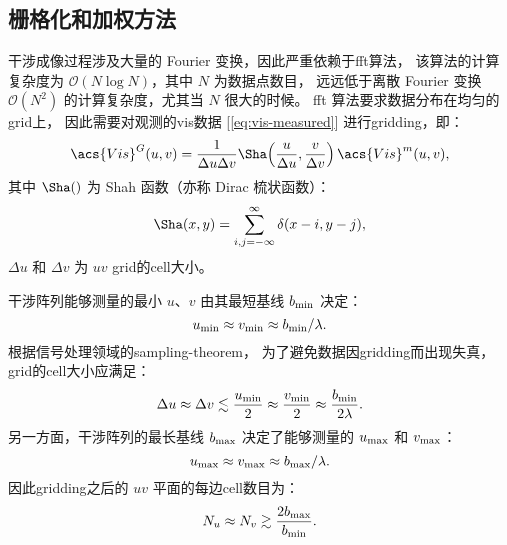\subsection{栅格化和加权方法}

干涉成像过程涉及大量的 Fourier 变换，因此严重依赖于\ac{fft}算法，
该算法的计算复杂度为 $\mathcal{O}(N \log N)$，其中 $N$ 为数据点数目，
远远低于离散 Fourier 变换 $\mathcal{O}(N^2)$ 的计算复杂度，尤其当 $N$ 很大的时候。
\ac{fft} 算法要求数据分布在均匀的\ac{grid}上，
因此需要对观测的\ac{vis}数据 [\autoref{eq:vis-measured}] 进行\ac{gridding}，即：
\begin{equation}
  \acs{Vis}^{G}(u,v)
    = \frac{1}{\Delta u \Delta v}
      \Sha\!\left( \frac{u}{\Delta u}, \frac{v}{\Delta v} \right)
      \acs{Vis}^{m}(u,v) ,
\end{equation}
其中
$\Sha()$ 为 Shah 函数（亦称 Dirac 梳状函数）：
\begin{equation}
  \Sha(x, y) = \sum_{i,j=-\infty}^{\infty} \delta(x-i, y-j) ,
\end{equation}
$\Delta u$ 和 $\Delta v$ 为 $uv$ \ac{grid}的\ac{cell}大小。

干涉阵列能够测量的最小 $u$、$v$ 由其最短基线 $b_{\mathrm{min}}$ 决定：
\begin{equation}
  u_{\mathrm{min}} \approx v_{\mathrm{min}} \approx b_{\mathrm{min}}/\lambda .
\end{equation}
根据信号处理领域的\ac{sampling-theorem}，
为了避免数据因\ac{gridding}而出现失真，\ac{grid}的\ac{cell}大小应满足：
\begin{equation}
  \Delta u \approx \Delta v
    \lesssim \frac{u_{\mathrm{min}}}{2} \approx \frac{v_{\mathrm{min}}}{2}
    \approx \frac{b_{\mathrm{min}}}{2 \lambda} .
\end{equation}
另一方面，干涉阵列的最长基线 $b_{\mathrm{max}}$ 决定了能够测量的
$u_{\mathrm{max}}$ 和 $v_{\mathrm{max}}$：
\begin{equation}
  u_{\mathrm{max}} \approx v_{\mathrm{max}} \approx b_{\mathrm{max}}/\lambda .
\end{equation}
因此\ac{gridding}之后的 $uv$ 平面的每边\ac{cell}数目为：
\begin{equation}
  N_u \approx N_v \gtrsim \frac{2 b_{\mathrm{max}}}{b_{\mathrm{min}}} .
\end{equation}

